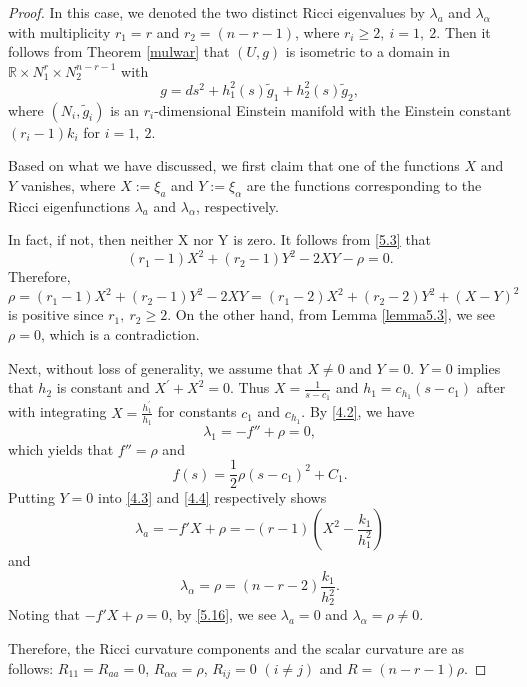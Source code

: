 \documentclass{amsart}
\theoremstyle{definition}
\theoremstyle{remark}
\numberwithin{equation}{section}
\begin{document}
	\begin{proof}
	In this case, we denoted the two distinct Ricci eigenvalues by $\lambda_a$ and $\lambda_\alpha$ 
	with multiplicity $r_1=r$ and $r_2=(n-r-1)$, where $r_i\geq2,\ i=1,\ 2$. 
	Then it follows from Theorem \ref{mulwar} that 
	$(U,g)$ is isometric to a domain in 
	$\mathbb{R}\times N^{r}_1 \times N^{n-r-1}_2$
	with
	\[
     g= ds^2 + h^2_1(s)\tilde{g}_{1}+h^2_{2}(s) \tilde{g}_{2}, 
	\]
	where $(N_i, \tilde{g}_{i})$ is an $r_i$-dimensional Einstein manifold 
	with the Einstein constant $(r_i-1)k_i$ for $i=1,\ 2$.
	
Based on what we have discussed,  we first claim that one of the functions $X$ and $Y$ vanishes,
where $X:=\xi_a$ and $Y:=\xi_\alpha$ are the functions corresponding to the Ricci eigenfunctions 
$\lambda_a$ and $\lambda_\alpha$, respectively.

In fact, if not, then neither X nor Y is zero. It follows from \eqref{5.3} that
		\[
		(r_1-1)X^2+(r_2-1)Y^2-2XY-\rho=0.
		\]
		Therefore,
		\[
		\rho=(r_1-1)X^2+(r_2-1)Y^2-2XY=(r_1-2)X^2+(r_2-2)Y^2+(X-Y)^2
		\]
		is positive since $r_1,~r_2\geq2$.
		On the other hand, from Lemma \ref{lemma5.3}, we see $\rho=0$,
		which is a contradiction.
	
	 Next, without loss of generality, we assume that $X\neq0$ and $Y=0$.
	$Y=0$ implies that $h_2$ is constant and $X^{'} + X^2=0$. Thus $X= \frac{1}{s-c_1}$ and 
	$h_1= c_{h_1} (s-c_1)$ after with integrating $X= \frac{h^{'}_1}{h_1}$ for constants $c_1$ and $c_{h_1}$.
	By \eqref{4.2}, we have
	\[
	\lambda_1=-f''+\rho=0,
	\]
	which yields that $f''=\rho$ and
	\[
	f(s) = \frac{1}{2} \rho (s-c_1)^2+C_1.
	\]
	Putting $Y=0$ into \eqref{4.3} and \eqref{4.4} respectively shows
	\begin{equation}\label{5.16}
	\lambda_a=-f'X+\rho=-(r-1)(X^2-\frac{k_1}{h^2_1} )
	\end{equation}
	and
    \[
   \lambda_\alpha=\rho=(n-r-2)\frac{k_1}{h^2_2}.
    \]
	Noting that $-f'X+\rho=0$, by \eqref{5.16}, we see $\lambda_a=0$
	and $\lambda_\alpha=\rho\neq0$. 
	
	Therefore, the Ricci curvature components and the scalar curvature are as follows:
	$R_{11} = R_{aa} =0$,
	$R_{\alpha\alpha}=\rho$, $R_{ij} =0$ 
	$(i \neq j)$ and 
	$R= (n-r-1)\rho $.
	

\end{proof}
\end{document}
